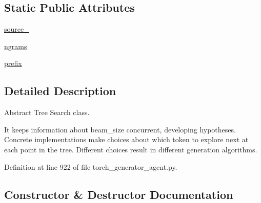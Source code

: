 \subsection*{Static Public Attributes}
\begin{DoxyCompactItemize}
\item 
\hyperlink{classparlai_1_1core_1_1torch__generator__agent_1_1TreeSearch_aeeed17550050be7b86c9e238b9df66e5}{source\+\_\+}
\item 
\hyperlink{classparlai_1_1core_1_1torch__generator__agent_1_1TreeSearch_aa9b00008fefdb77e7701ddbfc1865919}{ngrams}
\item 
\hyperlink{classparlai_1_1core_1_1torch__generator__agent_1_1TreeSearch_a2845139bf44df2fa8428565cd7558ce2}{prefix}
\end{DoxyCompactItemize}


\subsection{Detailed Description}
\begin{DoxyVerb}Abstract Tree Search class.

It keeps information about beam_size concurrent, developing hypotheses. Concrete
implementations make choices about which token to explore next at each point in the
tree. Different choices result in different generation algorithms.
\end{DoxyVerb}
 

Definition at line 922 of file torch\+\_\+generator\+\_\+agent.\+py.



\subsection{Constructor \& Destructor Documentation}
\mbox{\label{classparlai_1_1core_1_1torch__generator__agent_1_1TreeSearch_ac1496d6205b8156573f0e79f4ff5fa43}} 
